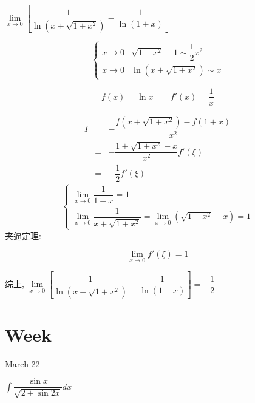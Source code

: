 \begin{example}[][Exam: 29.3.14]
	$\lim\limits_{x\rightarrow 0}\left[ \dfrac{1}{\ln(x+\sqrt{1+x^2})}-\dfrac{1}{\ln(1+x)}\right] $
\end{example}
\begin{solution}
	
	$$\begin{cases}
		x\to 0 & \sqrt{1+x^{2}}-1\sim \dfrac{1}{2}x^{2} \\
		x\to 0 & \ln(x+\sqrt{1+x^2}) \sim x
	\end{cases}$$

	
	$$f(x)=\ln x  \qquad f'(x) = \dfrac{1}{x}$$
	
	\begin{eqnarray*}
		I & = & -\dfrac{f(x+\sqrt{1+x^2})-f(1+x)}{x^{2}}\\
		  & = & -\dfrac{1+\sqrt{1+x^{2}}-x}{x^{2}}f'(\xi)\\
		  & = & -\dfrac{1}{2}f'(\xi)
	\end{eqnarray*} 
	$$\begin{cases}
	  \lim\limits_{x \to 0}\dfrac{1}{1+x} = 1\\
	  \lim\limits_{x \to 0}\dfrac{1}{x+\sqrt{1+x^{2}}} = \lim\limits_{x \to 0}(\sqrt{1+x^{2}}-x) = 1
	\end{cases}$$
	夹逼定理:

	$$\lim\limits_{x \to 0}f'(\xi) = 1$$
	
	综上, $\lim\limits_{x\rightarrow 0}\left[ \dfrac{1}{\ln(x+\sqrt{1+x^2})}-\dfrac{1}{\ln(1+x)}\right] =-\dfrac{1}{2}$
	
\end{solution}

\section{Week }

\textcolor{purplea}{March 22}

\begin{example}[][Exam: 29.4.1]
	$\int\dfrac{\sin x}{\sqrt{2+\sin 2x}}dx$
\end{example}

